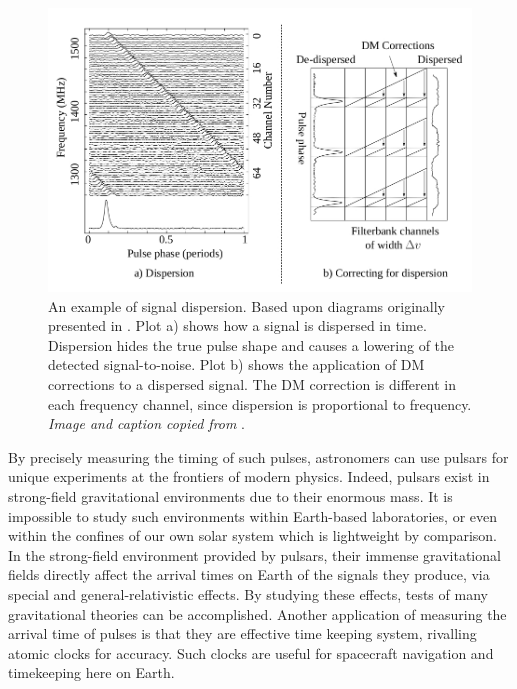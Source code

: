 \begin{figure}[!h]
\centering
\includegraphics[scale=0.3]{figures/fig-4}
\caption[Signal Dispersion]{An example of signal dispersion. Based upon diagrams originally presented in \citep{lorimer}. Plot a) shows how a signal is dispersed in time. Dispersion hides the true pulse shape and causes a lowering of the detected signal-to-noise. Plot b) shows the application of DM corrections to a dispersed signal. The DM correction is different in each frequency channel, since dispersion is proportional to frequency. \textit{Image and caption copied from} \citep{lyon}.}	
\label{fig:fig-4}
\end{figure}

By precisely measuring the timing of such pulses, astronomers can use pulsars for unique experiments at the frontiers of modern physics. Indeed, pulsars exist in strong-field gravitational environments due to their enormous mass. It is impossible to study such environments within Earth-based laboratories, or even within the confines of our own solar system which is lightweight by comparison. In the strong-field environment provided by pulsars, their immense gravitational fields directly affect the arrival times on Earth of the signals they produce, via special and general-relativistic effects. By studying these effects, tests of many gravitational theories can be accomplished.  Another application of measuring the arrival time of pulses is that they are effective time keeping system, rivalling atomic clocks for accuracy. Such clocks are useful for spacecraft navigation and timekeeping here on Earth.